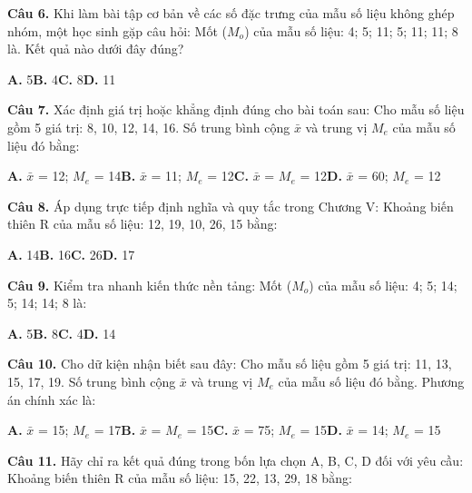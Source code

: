 \documentclass[11pt,a4paper]{article}
\begin{document}
\textbf{\color{primary} Câu 6.} Khi làm bài tập cơ bản về các số đặc trưng của mẫu số liệu không ghép nhóm, một học sinh gặp câu hỏi: Mốt ($M_o$) của mẫu số liệu: 4; 5; 11; 5; 11; 11; 8 là. Kết quả nào dưới đây đúng?\par
\hspace*{1.5em}\textbf{A.} 5\quad\quad \textbf{B.} 4\quad\quad \textbf{C.} 8\quad\quad \textbf{D.} 11\par\vspace{2pt}
\textbf{\color{primary} Câu 7.} Xác định giá trị hoặc khẳng định đúng cho bài toán sau: Cho mẫu số liệu gồm 5 giá trị: 8, 10, 12, 14, 16. Số trung bình cộng $\bar{x}$ và trung vị $M_e$ của mẫu số liệu đó bằng:\par
\hspace*{1.5em}\textbf{A.} $\bar{x}$ = 12; $M_e$ = 14\quad\quad \textbf{B.} $\bar{x}$ = 11; $M_e$ = 12\quad\quad \textbf{C.} $\bar{x}$ = $M_e$ = 12\quad\quad \textbf{D.} $\bar{x}$ = 60; $M_e$ = 12\par\vspace{2pt}
\textbf{\color{primary} Câu 8.} Áp dụng trực tiếp định nghĩa và quy tắc trong Chương V: Khoảng biến thiên R của mẫu số liệu: 12, 19, 10, 26, 15 bằng:\par
\hspace*{1.5em}\textbf{A.} 14\quad\quad \textbf{B.} 16\quad\quad \textbf{C.} 26\quad\quad \textbf{D.} 17\par\vspace{2pt}
\textbf{\color{primary} Câu 9.} Kiểm tra nhanh kiến thức nền tảng: Mốt ($M_o$) của mẫu số liệu: 4; 5; 14; 5; 14; 14; 8 là:\par
\hspace*{1.5em}\textbf{A.} 5\quad\quad \textbf{B.} 8\quad\quad \textbf{C.} 4\quad\quad \textbf{D.} 14\par\vspace{2pt}
\textbf{\color{primary} Câu 10.} Cho dữ kiện nhận biết sau đây: Cho mẫu số liệu gồm 5 giá trị: 11, 13, 15, 17, 19. Số trung bình cộng $\bar{x}$ và trung vị $M_e$ của mẫu số liệu đó bằng. Phương án chính xác là:\par
\hspace*{1.5em}\textbf{A.} $\bar{x}$ = 15; $M_e$ = 17\quad\quad \textbf{B.} $\bar{x}$ = $M_e$ = 15\quad\quad \textbf{C.} $\bar{x}$ = 75; $M_e$ = 15\quad\quad \textbf{D.} $\bar{x}$ = 14; $M_e$ = 15\par\vspace{2pt}
\textbf{\color{primary} Câu 11.} Hãy chỉ ra kết quả đúng trong bốn lựa chọn A, B, C, D đối với yêu cầu: Khoảng biến thiên R của mẫu số liệu: 15, 22, 13, 29, 18 bằng:\par
\end{document}
